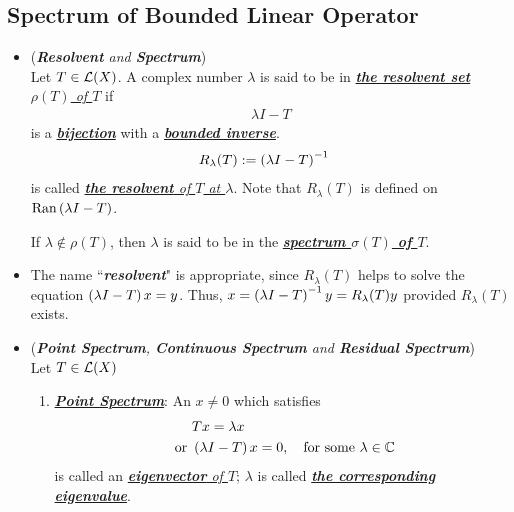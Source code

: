 \documentclass[11pt]{article}
\begin{document}
\subsection{Spectrum of Bounded Linear Operator}
\begin{itemize}
\item \begin{definition} (\emph{\textbf{Resolvent} and \textbf{Spectrum}})\\
Let $T \in {\mathcal L}(X)$. A complex number $\lambda$ is said to be in \underline{\emph{\textbf{the resolvent set} $\rho(T)$ of $T$}} if  
\begin{align*}
\lambda I - T
\end{align*} is a \underline{\emph{\textbf{bijection}}} with a \underline{\emph{\textbf{bounded inverse}}}. 
\begin{align*}
R_{\lambda}(T) &:= \left(\lambda I - T\right)^{-1}
\end{align*} is called \underline{\emph{\textbf{the resolvent} of  $T$ at $\lambda$}}. Note that $R_{\lambda}(T)$ is defined on $\text{Ran}\left(\lambda I - T\right)$.

If $\lambda \not\in \rho(T)$, then $\lambda$ is said  to be in the \underline{\emph{\textbf{spectrum $\sigma(T)$ of $T$}}}. 
\end{definition}

\item \begin{remark}
The name ``\emph{\textbf{resolvent}}" is appropriate, since $R_{\lambda}(T)$ helps to solve
the equation $\left(\lambda I - T\right)x = y$. Thus, $x = \left(\lambda I - T\right)^{-1}y =R_{\lambda}(T)y$ provided $R_{\lambda}(T)$ exists.
\end{remark}

\item \begin{definition} (\emph{\textbf{Point Spectrum}, \textbf{Continuous Spectrum} and \textbf{Residual Spectrum}})\\
Let  $T \in {\mathcal L}(X)$
\begin{enumerate}
\item  \underline{\emph{\textbf{Point Spectrum}}}: An $x \neq 0$ which satisfies 
\begin{align*}
&Tx = \lambda x\\
\text{ or } &\left(\lambda I - T\right)x = 0, \quad \text{for some $\lambda \in {\mathbb C}$}
\end{align*} is called an \underline{\emph{\textbf{eigenvector} of $T$}}; $\lambda$ is called \underline{\emph{\textbf{the corresponding eigenvalue}}}. 


\end{enumerate}
\end{definition}
\end{itemize}
\end{document}
